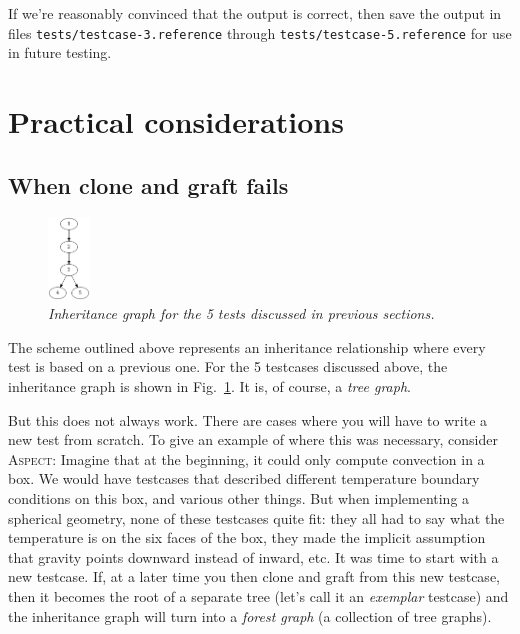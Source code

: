 \documentclass{article}
\newcommand{\aspect}{\textsc{Aspect}}
\begin{document}
If we're reasonably convinced that the output is correct, then save the output
in files \texttt{tests/testcase-3.reference} through
\texttt{tests/testcase-5.reference} for use in future testing.

\section{Practical considerations}
\label{sec:practice}

\subsection{When clone and graft fails}

\begin{figure}
  \begin{center}
    \vspace*{-24pt}
    \includegraphics[width=0.1\textwidth]{figures/inheritance.png}
    \vspace*{-12pt}
  \end{center}
  \caption{\it Inheritance graph for the 5 tests discussed in previous sections.}
  \vspace*{-3mm}
  \label{fig:inheritance}
\end{figure}
The scheme outlined above represents an inheritance relationship where every
test is based on a previous one. For the 5 testcases discussed above, the
inheritance graph is shown in Fig.~\ref{fig:inheritance}. It is, of course, a
\textit{tree graph}.

But this does not always work. There are cases where you will have to write a
new test from scratch. To give an example of where this was necessary,
consider \aspect{}: Imagine that at the beginning, it could only compute
convection in a box. We would have testcases that described different
temperature boundary conditions on this box, and various other things. But
when implementing a spherical geometry, none of these testcases quite fit:
they all had to say what the temperature is on the six faces of the box, they
made the implicit assumption that gravity points downward instead of inward,
etc. It was time to start with a new testcase. If, at a later time you then
clone and graft from this new testcase, then it becomes the root of a separate
tree (let's call it an \textit{exemplar} testcase) and the inheritance graph
will turn into a \textit{forest graph} (a collection of tree graphs).
\end{document}
